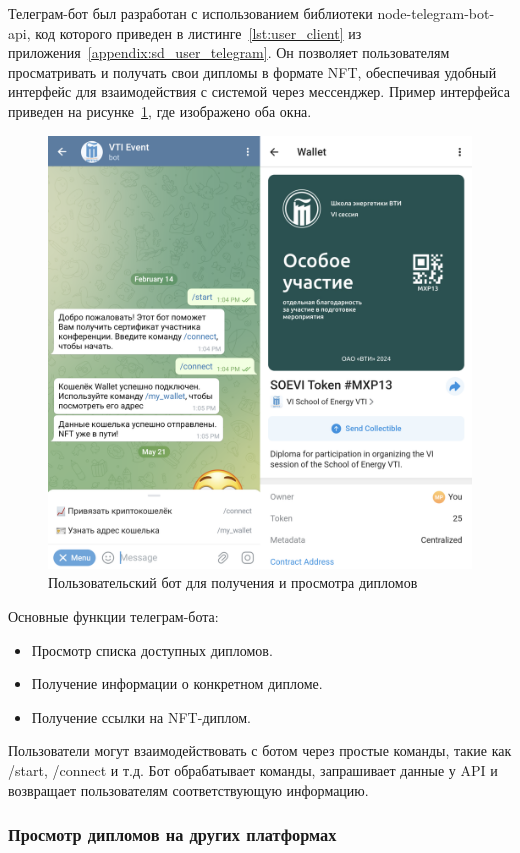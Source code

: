 Телеграм-бот был разработан с использованием библиотеки node-telegram-bot-api, код которого приведен в листинге~\ref{lst:user_client} из приложения~\ref{appendix:sd_user_telegram}. Он позволяет пользователям просматривать и получать свои дипломы в формате NFT, обеспечивая удобный интерфейс для взаимодействия с системой через мессенджер. Пример интерфейса приведен на рисунке~\ref{fig:s3_user_client}, где изображено оба окна.

\begin{figure}[H]
	\centering
	\includegraphics[width=.8\textwidth]{images/s3_user_client.png}
	\parskip=6pt
	\caption{Пользовательский бот для получения и просмотра дипломов}
	\label{fig:s3_user_client}
\end{figure}

Основные функции телеграм-бота:
\begin{itemize}
    \item Просмотр списка доступных дипломов.
    \item Получение информации о конкретном дипломе.
    \item Получение ссылки на NFT-диплом.
\end{itemize}

Пользователи могут взаимодействовать с ботом через простые команды, такие как /start, /connect и т.д. Бот обрабатывает команды, запрашивает данные у API и возвращает пользователям соответствующую информацию.

\subsubsection{Просмотр дипломов на других платформах}

